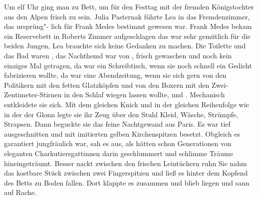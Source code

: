 Um elf Uhr ging man zu Bett, um für den Festtag mit der
fremden Königstochter aus den Alpen frisch zu sein. Julia
Pasternak führte Lea in das Fremdenzimmer, das ursprüng"-%
lich für Frank Medes bestimmt gewesen war. Frank Medes
bekam ein Reservebett in Roberts Zimmer aufgeschlagen\semi{}
das war sehr gemütlich für die beiden Jungen, Lea brauchte
sich keine Gedanken zu machen. Die Toilette und das Bad
waren , das Nachthemd war von , frisch
gewaschen und noch kein einziges Mal getragen, da war ein
Schreibtisch, wenn sie noch schnell ein Gedicht fabrizieren
wollte, da war eine Abendzeitung, wenn sie sich gern von den
Politikern mit den fetten Glatzköpfen und von den Boxern
mit den Zwei-Zentimeter-Stirnen in den Schlaf wiegen
lassen wollte, und .
\abstand{}
Mechanisch entkleidete sie sich. Mit dem gleichen Knick und
in der gleichen Reihenfolge wie in der der Glonn legte sie ihr Zeug
über den Stuhl\dopp{} Kleid, Wäsche, Strümpfe, Strapsen. Dann
beguckte sie das feine Nachtgewand aus Paris. Es war tief
ausgeschnitten und mit imitierten gelben Kirchenspitzen
besetzt. Obgleich es garantiert jungfräulich war, sah es aus, als
hätten schon Generationen von eleganten Charkutiersgattinnen
darin geschlummert und schlimme Träume hineingeträumt.
Besser nackt zwischen den frischen Leintüchern ruhn\ausr{} Sie nahm
das kostbare Stück zwischen zwei Fingerspitzen und ließ es
hinter dem Kopfend des Betts zu Boden fallen. Dort klappte
es zusammen und blieb liegen und sann auf Rache.

